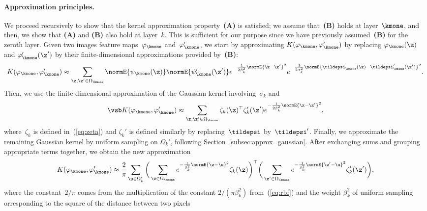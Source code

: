 \paragraph{Approximation principles.}
\vspace*{-0.75cm}
We proceed recursively to show that the kernel approximation
property~{\bfseries (A)}
is satisfied; we assume that~{\bfseries (B)}
holds at layer~$\kmone$, and then, we show that {\bfseries (A)} and
{\bfseries (B)} also hold at layer~$k$.  This is sufficient for our 
purpose since we have previously assumed~{\bfseries (B)} for the zeroth layer.  
Given two images feature maps~$\varphi_{\kmone}$ and~$\varphi_{\kmone}'$, we 
start by approximating $K(\varphi_{\kmone},\varphi_{\kmone}')$ by replacing
$\varphi_{\kmone}(\z)$ and $\varphi_{\kmone}'(\z')$ by their finite-dimensional
approximations provided by~{\bfseries (B)}: 
\begin{equation}
   K(\varphi_{\kmone},\varphi_{\kmone}') \approx 
   \sum_{\z,\z' \in \Omega_{\kmone}} \normE{\psi_{\kmone}(\z)}  \normE{\psi_{\kmone}'(\z')} e^{-\frac{1}{2\beta_{k}^2}\normE{\z-\z'}^2} e^{-\frac{1}{2\sigma_k^2} \normE{\tildepsi_{\kmone}(\z)-\tildepsi_{\kmone}'(\z')}^2}.
\end{equation}
Then, we use the finite-dimensional approximation of the Gaussian kernel
involving~$\sigma_k$ and
\begin{equation}
         \vsb
   K(\varphi_{\kmone},\varphi_{\kmone}') \approx 
   \sum_{\z, \z' \in \Omega_{\kmone}} \zeta_k(\z)^\top \zeta_k'(\z') e^{-\frac{1}{2\beta_k^2}\normE{\z-\z'}^2},
\end{equation}
where~$\zeta_k$ is defined in~(\ref{eq:zeta}) and $\zeta_k'$ is defined
similarly by replacing~$\tildepsi$ by~$\tildepsi'$.  Finally, we approximate
the remaining Gaussian kernel by uniform sampling on $\Omega_{k}'$,
following Section~\ref{subsec:approx_gaussian}.
After exchanging sums and grouping appropriate terms together, we obtain the new approximation 
\begin{equation}
   K(\varphi_{\kmone},\varphi_{\kmone}') \approx \frac{2}{\pi} \sum_{\u \in \Omega_{k}'} \bigg( \sum_{\z \in \Omega_{\kmone}} e^{-\frac{1}{\beta_k^2}\normE{\z-\u}^2}\zeta_k(\z) \bigg)^\top \bigg( \sum_{\z' \in \Omega_{\kmone}}  e^{-\frac{1}{\beta_k^2}\normE{\z'-\u}^2} \zeta_k'(\z')  \bigg), \label{eq:approx}
\end{equation}
where the constant~$2/\pi$ comes from the multiplication of the constant
$2/(\pi\beta_k^2)$ from~(\ref{eq:rbf}) and the weight $\beta_k^2$ of uniform sampling
orresponding to the square of the distance between two pixels
